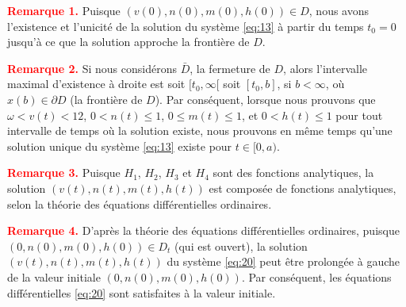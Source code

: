 	\begin{boxR}
		\textbf{\textcolor{red}{Remarque 1.}} Puisque $(v(0), n(0), m(0), h(0)) \in D$, nous avons l'existence et l'unicité de la solution du système \eqref{eq:13} à partir du temps $t_0 = 0$ jusqu'à ce que la solution approche la frontière de $D$.
	\end{boxR}
	
	\begin{boxR}
		\textbf{\textcolor{red}{Remarque 2.}} Si nous considérons $\bar{D}$, la fermeture de $D$, alors l'intervalle maximal d'existence à droite est soit $[t_0, \infty[$ soit $[t_0, b]$, si $b < \infty$, où $x(b) \in \partial D$ (la frontière de $D$). Par conséquent, lorsque nous prouvons que $\omega < v(t) < 12$, $0 < n(t) \leq 1$, $0 \leq m(t) \leq 1$, et $0 < h(t) \leq 1$ pour tout intervalle de temps où la solution existe, nous prouvons en même temps qu'une solution unique du système \eqref{eq:13} existe pour $t \in [0, a)$.
	\end{boxR}

	\begin{boxR}
		\textbf{\textcolor{red}{Remarque 3.}} Puisque $H_1$, $H_2$, $H_3$ et $H_4$ sont des fonctions analytiques, la solution $(v(t), n(t), m(t), h(t))$ est composée de fonctions analytiques, selon la théorie des équations différentielles ordinaires.
	\end{boxR}
	
	\begin{boxR}
		\textbf{\textcolor{red}{Remarque 4.}} D'après la théorie des équations différentielles ordinaires, puisque $(0, n(0), m(0), h(0)) \in D_t$ (qui est ouvert), la solution $(v(t), n(t), m(t), h(t))$ du système \eqref{eq:20} peut être prolongée à gauche de la valeur initiale $(0, n(0), m(0), h(0))$. Par conséquent, les équations différentielles \eqref{eq:20} sont satisfaites à la valeur initiale.
	\end{boxR}
